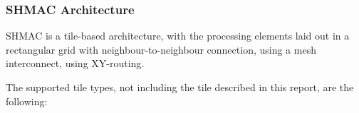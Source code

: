 \subsubsection{SHMAC Architecture}

SHMAC is a tile-based architecture, with the processing elements laid out in a rectangular grid with neighbour-to-neighbour connection, using a mesh interconnect, using XY-routing.

The supported tile types, not including the tile described in this report, are the following:
